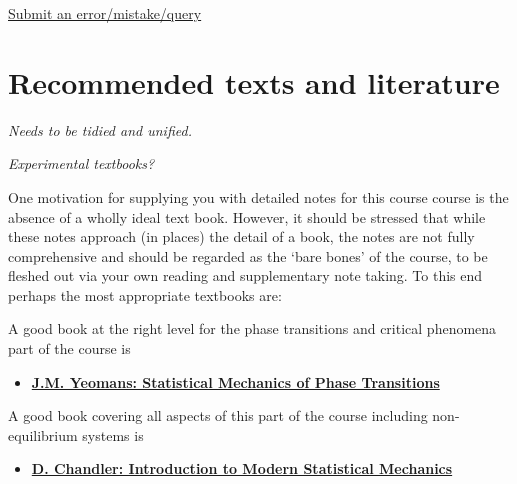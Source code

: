 \documentclass[
  letterpaper,
  enabledeprecatedfontcommands]{report}
\providecommand{\tightlist}{%
  \setlength{\itemsep}{0pt}\setlength{\parskip}{0pt}}
\begin{document}
\begin{tcolorbox}[enhanced jigsaw, leftrule=.75mm, bottomrule=.15mm, colback=white, colframe=quarto-callout-note-color-frame, arc=.35mm, breakable, rightrule=.15mm, left=2mm, opacityback=0, toprule=.15mm]

\href{https://forms.office.com/e/6uL2Bd5QGq}{Submit an
error/mistake/query}

\end{tcolorbox}


\chapter*{Recommended texts and literature}\label{literature}


\emph{Needs to be tidied and unified.}

\emph{Experimental textbooks?}

One motivation for supplying you with detailed notes for this course
course is the absence of a wholly ideal text book. However, it should be
stressed that while these notes approach (in places) the detail of a
book, the notes are not fully comprehensive and should be regarded as
the `bare bones' of the course, to be fleshed out via your own reading
and supplementary note taking. To this end perhaps the most appropriate
textbooks are:

A good book at the right level for the phase transitions and critical
phenomena part of the course is

\begin{itemize}
\tightlist
\item
  \textbf{\href{https://bris.on.worldcat.org/search/detail/24699159?queryString=yeomans\%20statistical&clusterResults=true&stickyFacetsChecked=true&groupVariantRecords=false&newsArticles=off&bookReviews=off}{J.M.
  Yeomans: Statistical Mechanics of Phase Transitions}}
\end{itemize}

A good book covering all aspects of this part of the course including
non-equilibrium systems is

\begin{itemize}
\tightlist
\item
  \textbf{\href{https://bris.on.worldcat.org/search/detail/941821555?queryString=chandler\%20statistical&clusterResults=true&stickyFacetsChecked=true&groupVariantRecords=false&newsArticles=off&bookReviews=off}{D.
  Chandler: Introduction to Modern Statistical Mechanics}}
\end{itemize}
\end{document}

